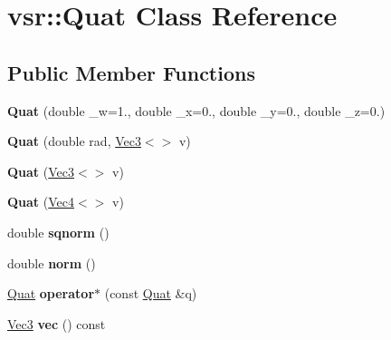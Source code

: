\hypertarget{classvsr_1_1_quat}{\section{vsr\-:\-:Quat Class Reference}
\label{classvsr_1_1_quat}
}
\subsection*{Public Member Functions}
\begin{DoxyCompactItemize}
\item 
\hypertarget{classvsr_1_1_quat_a0c1c265775a108d3239d6ee6f5a70542}{{\bfseries Quat} (double \-\_\-w=1., double \-\_\-x=0., double \-\_\-y=0., double \-\_\-z=0.)}\label{classvsr_1_1_quat_a0c1c265775a108d3239d6ee6f5a70542}

\item 
\hypertarget{classvsr_1_1_quat_a8e6fae7c1df2fa0e78eebd9f7085921d}{{\bfseries Quat} (double rad, \hyperlink{classvsr_1_1_vec3}{Vec3}$<$$>$ v)}\label{classvsr_1_1_quat_a8e6fae7c1df2fa0e78eebd9f7085921d}

\item 
\hypertarget{classvsr_1_1_quat_a2bb7d27eb674c17e70f8c26cb7fbe6f4}{{\bfseries Quat} (\hyperlink{classvsr_1_1_vec3}{Vec3}$<$$>$ v)}\label{classvsr_1_1_quat_a2bb7d27eb674c17e70f8c26cb7fbe6f4}

\item 
\hypertarget{classvsr_1_1_quat_a4a2fd43e3f66c6303a441f5b5310712f}{{\bfseries Quat} (\hyperlink{classvsr_1_1_vec4}{Vec4}$<$$>$ v)}\label{classvsr_1_1_quat_a4a2fd43e3f66c6303a441f5b5310712f}

\item 
\hypertarget{classvsr_1_1_quat_a5eabcfac0fd8f55ef9e357953a203921}{double {\bfseries sqnorm} ()}\label{classvsr_1_1_quat_a5eabcfac0fd8f55ef9e357953a203921}

\item 
\hypertarget{classvsr_1_1_quat_af5ead8ec1a9957b560a6c07f4846d207}{double {\bfseries norm} ()}\label{classvsr_1_1_quat_af5ead8ec1a9957b560a6c07f4846d207}

\item 
\hypertarget{classvsr_1_1_quat_a6ea0d5b5c187fb8bb572acee37dd140e}{\hyperlink{classvsr_1_1_quat}{Quat} {\bfseries operator$\ast$} (const \hyperlink{classvsr_1_1_quat}{Quat} \&q)}\label{classvsr_1_1_quat_a6ea0d5b5c187fb8bb572acee37dd140e}

\item 
\hypertarget{classvsr_1_1_quat_a9e3da000e6e4fd9513f5e9e40a64ded5}{\hyperlink{classvsr_1_1_vec3}{Vec3} {\bfseries vec} () const }\label{classvsr_1_1_quat_a9e3da000e6e4fd9513f5e9e40a64ded5}


\end{DoxyCompactItemize}
